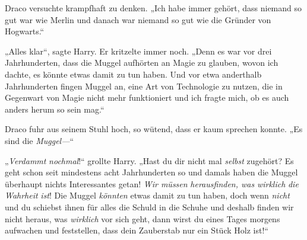 Draco versuchte krampfhaft zu denken. „Ich habe immer gehört, dass niemand so gut war wie Merlin und danach war niemand so gut wie die Gründer von Hogwarts.“

„Alles klar“, sagte Harry. Er kritzelte immer noch. „Denn es war vor drei Jahrhunderten, dass die Muggel aufhörten an Magie zu glauben, wovon ich dachte, es könnte etwas damit zu tun haben. Und vor etwa anderthalb Jahrhunderten fingen Muggel an, eine Art von Technologie zu nutzen, die in Gegenwart von Magie nicht mehr funktioniert und ich fragte mich, ob es auch anders herum so sein mag.“

Draco fuhr aus seinem Stuhl hoch, so wütend, dass er kaum sprechen konnte. „Es sind die \emph{Muggel—}“

„\emph{Verdammt} \emph{nochmal}!“ grollte Harry. „Hast du dir nicht mal \emph{selbst} zugehört? Es geht schon seit mindestens acht Jahrhunderten so und damals haben die Muggel überhaupt nichts Interessantes getan! \emph{Wir müssen} \emph{herausfinden, was} \emph{wirklich} \emph{die} \emph{Wahrheit} \emph{ist}! Die Muggel \emph{könnten} etwas damit zu tun haben, doch wenn \emph{nicht} und du schiebst ihnen für alles die Schuld in die Schuhe und deshalb finden wir nicht heraus, was \emph{wirklich} vor sich geht, dann wirst du eines Tages morgens aufwachen und feststellen, dass dein Zauberstab nur ein Stück Holz ist!“

